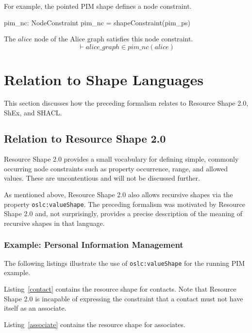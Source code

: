 \documentclass{article}
\begin{document}
For example, the pointed PIM shape defines a node constraint.
\begin{axdef}
	pim\_nc: NodeConstraint
\where
	pim\_nc = shapeConstraint(pim\_ps)
\end{axdef}

The $alice$ node of the Alice graph satisfies this node constraint.
\[\vdash
	alice\_graph \in pim\_nc(alice)
\]

\section{Relation to Shape Languages}
\label{sec-languages}

This section discusses how the preceding formalism relates to Resource Shape 2.0, ShEx, and SHACL.

\subsection{Relation to Resource Shape 2.0}

Resource Shape 2.0 provides a small vocabulary for defining simple, commonly occurring node constraints
such as property occurrence, range, and allowed values. These are uncontentious and will not be discussed further.

As mentioned above, Resource Shape 2.0 also allows recursive shapes via the property {\tt oslc:valueShape}.
The preceding formalism was motivated by Resource Shape 2.0 and, not surprisingly, provides a precise
description of the meaning of recursive shapes in that language.

\subsubsection{Example: Personal Information Management}
The following listings illustrate the use of {\tt oslc:valueShape} for the running PIM example.

Listing~\ref{contact} contains the resource shape for contacts.
\cbstart
Note that Resource Shape 2.0 is incapable of expressing the constraint that a contact must not have itself as an associate.
\cbend


Listing~\ref{associate} contains the resource shape for associates.

\end{document}
